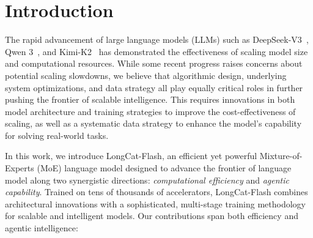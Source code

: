 \documentclass{article}
\newcommand{\longcat}{LongCat-Flash\xspace}
\newcommand{\chip}{accelerators\xspace}
\begin{document}
\clearpage
\tableofcontents
\clearpage

\section{Introduction}

The rapid advancement of large language models (LLMs) such as DeepSeek-V3~\citep{deepseekai2025deepseekv3technicalreport}, Qwen 3~\citep{yang2025qwen3}, and Kimi-K2~\citep{team2025kimi} has demonstrated the effectiveness of scaling model size and computational resources. While some recent progress raises concerns about potential scaling slowdowns, we believe that algorithmic design, underlying system optimizations, and data strategy all play equally critical roles in further pushing the frontier of scalable intelligence. This requires innovations in both model architecture and training strategies to improve the cost-effectiveness of scaling, as well as a systematic data strategy to enhance the model's capability for solving real-world tasks.

In this work, we introduce \longcat, an efficient yet powerful Mixture-of-Experts (MoE) language model designed to advance the frontier of language model along two synergistic directions: \emph{computational efficiency} and \emph{agentic capability}. Trained on tens of thousands of \chip, \longcat combines architectural innovations with a sophisticated, multi-stage training methodology for scalable and intelligent models. Our contributions span both efficiency and agentic intelligence:
\end{document}
